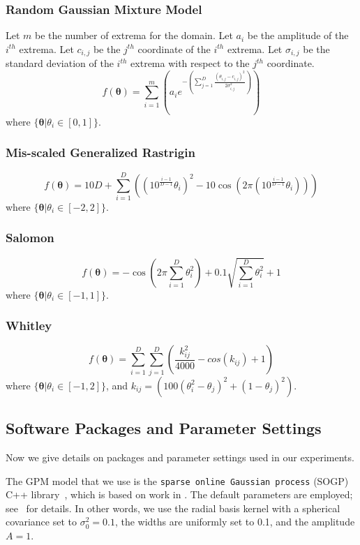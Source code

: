 \subsubsection{Random Gaussian Mixture Model}

Let $m$ be the number of extrema for the domain.
Let $a_i$ be the amplitude of the $i^{th}$ extrema.
Let $c_{i,j}$ be the $j^{th}$ coordinate of the $i^{th}$ extrema.
Let $\sigma_{i,j}$ be the standard deviation of the $i^{th}$ extrema with respect to the  $j^{th}$ coordinate.
$$
f(\boldsymbol{\theta}) = \sum_{i=1}^{m}\left(a_i e^{-\left(\sum_{j=1}^{D}\frac{\left(\theta_{i,j}-c_{i,j}\right)^2}{2\sigma_{i,j}^2}\right)}\right)
$$
where $\{\boldsymbol{\theta}|\theta_i\in [0,1]\}$.


\subsubsection{Mis-scaled Generalized Rastrigin}
$$
f(\boldsymbol{\theta}) = 10D + \sum_{i=1}^{D}\left((10^{\frac{i-1}{D-1}}\theta_i)^2 - 10\cos(2\pi(10^{\frac{i-1}{D-1}}\theta_i))\right)
$$
where
$\{\boldsymbol{\theta}|\theta_i\in [-2,2]\}$.


\subsubsection{Salomon}
$$
f(\boldsymbol{\theta}) = -\cos\left(2\pi\sum_{i=1}^D\theta_i^2\right) + 0.1\sqrt{\sum_{i=1}^D\theta_i^2} + 1
$$
where $\{\boldsymbol{\theta}|\theta_i\in [-1,1]\}$.

\subsubsection{Whitley}
$$
f(\boldsymbol{\theta}) = \sum_{i=1}^{D}\sum_{j=1}^{D}\left(\frac{k_{ij}^2}{4000} - cos(k_{ij}) + 1\right)
$$
where $\{\boldsymbol{\theta}|\theta_i\in [-1,2]\}$, and
$k_{ij} = (100(\theta_i^2-\theta_j)^2 + (1-\theta_j)^2)$.

\subsection{Software Packages and Parameter Settings}
\label{sec:package}

Now we give details on packages and parameter settings used in our experiments.

The GPM model that we use is the \texttt{sparse online Gaussian process} (SOGP) C++ library~\cite{gpm}, which is based on work in \cite{Csato2002,CsatoOpper2002}.
%
The default parameters are employed; see~\cite{CsatoOpper2002} for details.
%
In other words, we use the radial basis kernel with a spherical covariance set to $\sigma_0^2 = 0.1$, the widths are uniformly set to 0.1, and the amplitude $A=1$.

